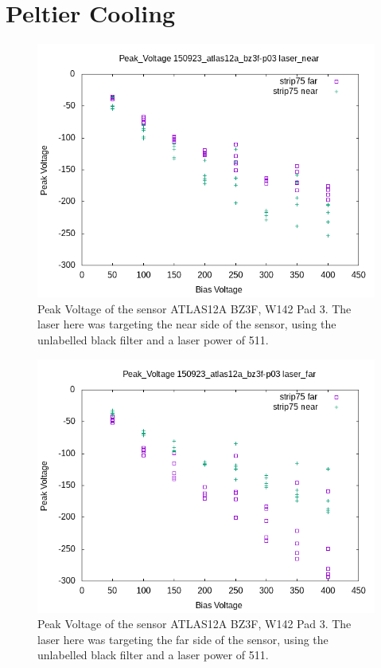 \documentclass{report}
\begin{document}
            

        \section{Peltier Cooling}
            \begin{figure}[h] 
                \includegraphics[height=.4\textheight]{Peak_Voltage__150923_atlas12a_bz3f-p03__laser_near}
                \centering
                \caption{ Peak Voltage of the sensor ATLAS12A BZ3F, W142 Pad 3. The laser here was targeting the near side of the sensor, using the unlabelled black filter and a laser power of 511. }
                \label{fig:Peak_Voltage__150923_atlas12a_bz3f-p03__laser_near}
            \end{figure}

            \begin{figure}[h] 
                \includegraphics[height=.4\textheight]{Peak_Voltage__150923_atlas12a_bz3f-p03__laser_far}
                \centering
                \caption{ Peak Voltage of the sensor ATLAS12A BZ3F, W142 Pad 3. The laser here was targeting the far side of the sensor, using the unlabelled black filter and a laser power of 511. }
                \label{fig:Peak_Voltage__150923_atlas12a_bz3f-p03__laser_far}
            \end{figure}
\end{document}
